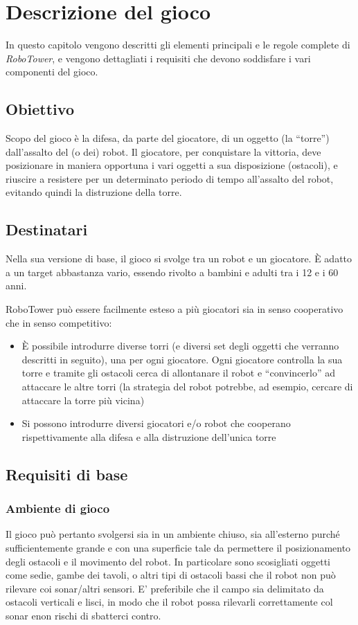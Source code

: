 \chapter{Descrizione del gioco}
\label{cap:descrizione}

In questo capitolo vengono descritti gli elementi principali e le regole complete di \emph{RoboTower}, e vengono dettagliati i requisiti che devono soddisfare i vari componenti del gioco.

\section{Obiettivo}
Scopo del gioco è la difesa, da parte del giocatore, di un oggetto (la ``torre'') dall'assalto del (o dei) robot. 
Il giocatore, per conquistare la vittoria, deve posizionare in maniera opportuna i vari oggetti a sua disposizione (ostacoli), e riuscire a resistere per un determinato periodo di tempo all'assalto del robot, evitando quindi la distruzione della torre.

\section{Destinatari}
Nella sua versione di base, il gioco si svolge tra un robot e un giocatore. È adatto a un target abbastanza vario, essendo rivolto a bambini e adulti tra i 12 e i 60 anni.

RoboTower può essere facilmente esteso a più giocatori sia in senso cooperativo che in senso competitivo:
	\begin{itemize}
		\item È possibile introdurre diverse torri (e diversi set degli oggetti che verranno descritti in seguito), una per ogni giocatore. Ogni giocatore controlla la sua torre e tramite gli ostacoli cerca di allontanare il robot e ``convincerlo'' ad attaccare le altre torri (la strategia del robot potrebbe, ad esempio, cercare di attaccare la torre più vicina)
		\item Si possono introdurre diversi giocatori e/o robot che cooperano rispettivamente alla difesa e alla distruzione dell'unica torre
	\end{itemize}

\section{Requisiti di base}

\subsection*{Ambiente di gioco}
Il gioco può pertanto svolgersi sia in un ambiente chiuso, sia all'esterno purché sufficientemente grande e con una superficie tale da permettere il posizionamento degli ostacoli e il movimento del robot. In particolare sono scosigliati oggetti come sedie, gambe dei tavoli, o altri tipi di ostacoli bassi che il robot non può rilevare coi sonar/altri sensori. E' preferibile che il campo sia delimitato da ostacoli verticali e lisci, in modo che il robot possa rilevarli correttamente col sonar enon rischi di sbatterci contro.

